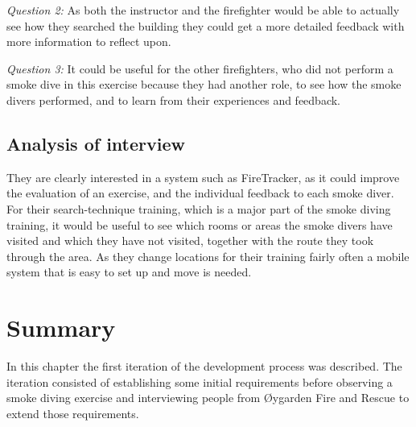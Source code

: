 \documentclass[../Main/thesis.tex]{subfiles}
\begin{document}
\textit{Question 2:}
As both the instructor and the firefighter would be able to actually see how they searched the building they could get a more detailed feedback with more information to reflect upon.

\textit{Question 3:}
It could be useful for the other firefighters, who did not perform a smoke dive in this exercise because they had another role, to see how the smoke divers performed, and to learn from their experiences and feedback.

\subsection{Analysis of interview}
They are clearly interested in a system such as FireTracker, as it could improve the evaluation of an exercise, and the individual feedback to each smoke diver.
For their search-technique training, which is a major part of the smoke diving training, it would be useful to see which rooms or areas the smoke divers have visited and which they have not visited, together with the route they took through the area.
As they change locations for their training fairly often a mobile system that is easy to set up and move is needed.

\section{Summary}
In this chapter the first iteration of the development process was described.
The iteration consisted of establishing some initial requirements before observing a smoke diving exercise and interviewing people from Øygarden Fire and Rescue to extend those requirements.
\end{document}
